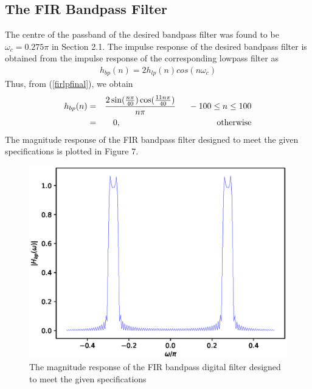 \documentclass{article}
\begin{document}
\subsection{The FIR Bandpass Filter}
The centre of the passband of the desired bandpass filter was found to be $\omega_c = 0.275\pi$ in Section
2.1.  The impulse response of the desired bandpass filter is obtained from the impulse response of the
corresponding lowpass filter as
\begin{eqnarray}
h_{bp}(n) = 2h_{lp}(n)cos(n\omega_c)
\end{eqnarray}
Thus, from (\ref{firlpfinal}), we obtain
\begin{eqnarray}
\label{firbpfinal}
h_{bp}(n) &=& \frac{2\sin(\frac{n\pi}{40}) \cos(\frac{11n\pi}{40})}{n\pi} \indent -100 \leq n \leq 100 \nonumber \\
&=& 0, \hspace{4cm} \mbox{otherwise}
\end{eqnarray}
%
The magnitude response of the FIR bandpass filter designed to meet the given specifications is plotted in Figure 7.
\begin{figure}
\label{fig7}
\includegraphics[width = 15cm]{./figs/fir-bandpass.eps}
\caption{The magnitude response of the FIR bandpass digital filter designed to meet the given specifications} 
\end{figure}
\end{document}
